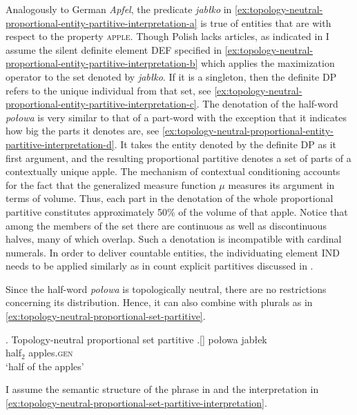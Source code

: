 	Analogously to German \textit{Apfel}, the predicate \textit{jabłko} in \ref{ex:topology-neutral-proportional-entity-partitive-interpretation-a} is true of entities that are  with respect to the property \textsc{apple}. Though Polish lacks articles, as indicated in  
    I assume the silent definite element DEF specified in \ref{ex:topology-neutral-proportional-entity-partitive-interpretation-b} which applies the maximization operator  to the set denoted by \textit{jabłko}. If it is a singleton, then the definite DP refers to the unique individual from that set, see \ref{ex:topology-neutral-proportional-entity-partitive-interpretation-c}. The denotation of the half-word \textit{połowa} is very similar to that of a part-word with the exception that it indicates how big the parts it denotes are, see \ref{ex:topology-neutral-proportional-entity-partitive-interpretation-d}. It takes the  entity denoted by the definite DP as it first argument, and the resulting proportional partitive denotes a set of parts of a contextually unique apple. The mechanism of contextual conditioning accounts for the fact that the generalized measure function $\mu$ measures its argument in terms of volume. Thus, each part in the denotation of the whole proportional partitive constitutes approximately 50\% of the volume of that apple. Notice that among the members of the set there are continuous as well as discontinuous halves, many of which overlap. Such a denotation is incompatible with cardinal numerals. In order to deliver countable entities, the individuating element IND needs to be applied similarly as in count explicit partitives discussed in  .
	
	Since the half-word \textit{połowa} is topologically neutral, there are no restrictions concerning its distribution. Hence, it can also combine with plurals as in \ref{ex:topology-neutral-proportional-set-partitive}. 

	\ex. Topology-neutral proportional set partitive\label{ex:topology-neutral-proportional-set-partitive}
	\bg.[] połowa jabłek\\
	half$_2$ apples\textsc{.gen}\\
	`half of the apples'

I assume the semantic structure of the phrase in  and the interpretation in \ref{ex:topology-neutral-proportional-set-partitive-interpretation}.

